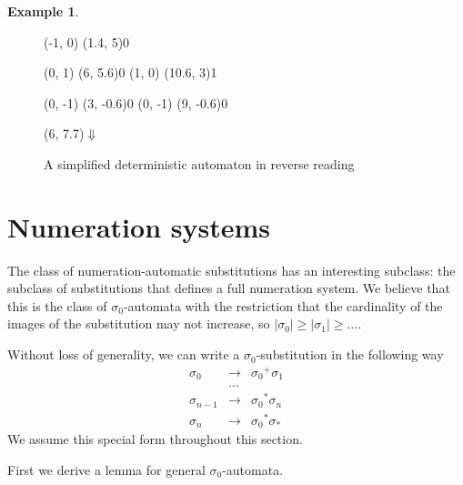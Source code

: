 \documentclass{article}
\theoremstyle{definition}
\newtheorem{example}[theorem]{Example}
\begin{document}
\begin{example}
\begin{itemize}
\begin{figure}[H]
\begin{graph}
   
   

  (-1, 0) \freetext(1.4, 5){0}
   
   
   

   
   
  (0, 1) \freetext(6, 5.6){0}
   
   
  (1, 0) \freetext(10.6, 3){1}

  
  (0, -1) \freetext(3, -0.6){0}
   
  (0, -1) \freetext(9, -0.6){0}
   

  \freetext(6, 7.7){$\Downarrow$}
\end{graph}
\caption{A simplified deterministic automaton in reverse reading}
\label{fig:simpl_det_reverse}
\end{figure}
\end{itemize}
\end{example}

\section{Numeration systems}
The class of numeration-automatic substitutions has an interesting subclass:
the subclass of substitutions that defines a full numeration system. We 
believe that this is the class of $\sigma_0$-automata with the restriction
that the cardinality of the images of the substitution may not increase,
so $|\sigma_0| \ge |\sigma_1| \ge \ldots$.

Without loss of generality, we can write a $\sigma_0$-substitution in the
following way
\begin{eqnarray*}
\sigma_0       &\rightarrow& {\sigma_0}^+ \sigma_1\\
               &\ldots&\\
\sigma_{n - 1} &\rightarrow& {\sigma_0}^* \sigma_n\\
\sigma_n       &\rightarrow& {\sigma_0}^* \sigma_*
\end{eqnarray*}
We assume this special form throughout this section.

First we derive a lemma for general $\sigma_0$-automata.
\end{document}
